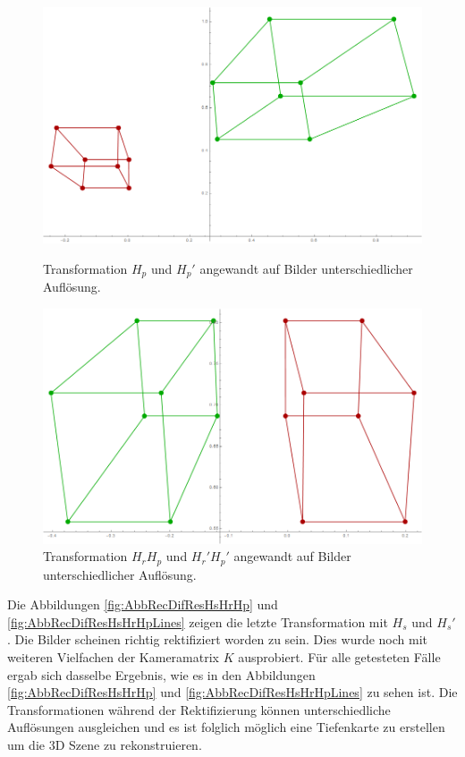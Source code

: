 \begin{figure}[!htb]
	\includegraphics[width=\linewidth]{images/Rectification_Hp_different_Solutions.png}
	\caption[Transformation $H_p$ und $H_p'$ angewandt auf Bilder unterschiedlicher Auflösungen]{Transformation $H_p$ und $H_p'$ angewandt auf Bilder unterschiedlicher Auflösung.}
	\label{fig:AbbRecDifResHp}
	\endminipage\hfill
	\includegraphics[width=\linewidth]{images/Rectification_HrHp_different_Solutions.png}
	\caption[Transformation $H_rH_p$ und $H_r'H_p'$ angewandt auf Bilder unterschiedlicher Auflösungen]{Transformation $H_rH_p$ und $H_r'H_p'$ angewandt auf Bilder unterschiedlicher Auflösung.}
	\label{fig:AbbRecDifResHrHp}
	\endminipage\hfill
\end{figure}

Die Abbildungen \ref{fig:AbbRecDifResHsHrHp} und \ref{fig:AbbRecDifResHsHrHpLines} zeigen die letzte Transformation mit $H_s$ und $H_s'$. Die Bilder scheinen richtig rektifiziert worden zu sein. Dies wurde noch mit weiteren Vielfachen der Kameramatrix $K$ ausprobiert. Für alle getesteten Fälle ergab sich dasselbe Ergebnis, wie es in den Abbildungen \ref{fig:AbbRecDifResHsHrHp} und \ref{fig:AbbRecDifResHsHrHpLines} zu sehen ist. Die Transformationen während der Rektifizierung können unterschiedliche Auflösungen ausgleichen und es ist folglich möglich eine Tiefenkarte zu erstellen um die 3D Szene zu rekonstruieren. 

